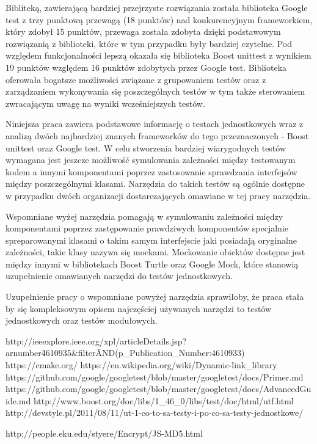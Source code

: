 \documentclass[12pt,a4paper,notitlepage]{report}
\begin{document}
	Bibliteką, zawierającą bardziej przejrzyste rozwiązania została biblioteka Google test z trzy punktową przewagą (18 punktów) nad konkurencyjnym frameworkiem, który zdobył 15 punktów, przewaga została zdobyta dzięki podstawowym rozwiązanią z biblioteki, które w tym przypadku były bardziej czytelne. Pod względem funkcjonalności lepszą okazała się biblioteka Boost unittest z wynikiem 19 punktów względem 16 punktów zdobytych przez Google test. Biblioteka oferowała bogatsze możliwości związane z grupowaniem testów oraz z zarządzaniem wykonywania się poszczególnych testów w tym także sterowaniem zwracającym uwagę na wyniki wcześniejszych testów.

	Niniejsza praca zawiera podstawowe informację o testach jednostkowych wraz z analizą dwóch najbardziej znanych frameworków do tego przeznaczonych - Boost unittest oraz Google test. W celu stworzenia bardziej wiarygodnych testów wymagana jest jeszcze możliwość symulowania zależności między testowanym kodem a innymi komponentami poprzez zastosowanie sprawdzania interfejsów między poszczególnymi klasami. Narzędzia do takich testów są ogólnie dostępne w przypadku dwóch organizacji dostarczających omawiane w tej pracy narzędzia.

	Wspomniane wyżej narzędzia pomagają w symulowaniu zależności między komponentami poprzez zastępowanie prawdziwych komponentów specjalnie spreparowanymi klasami o takim samym interfejscie jaki posiadają oryginalne zależności, takie klasy nazywa się mockami. Mockowanie obiektów dostępne jest między innymi w bibliotekach Boost Turtle oraz Google Mock, które stanowią uzupełnienie omawianych narzędzi do testów jednostkowych.

	Uzupełnienie pracy o wspomniane powyżej narzędzia sprawiłoby, że praca stała by się kompleksowym opisem najczęściej używanych narzędzi to testów jednostkowych oraz testów modułowych.

	\begin{thebibliography}{1}
		 http://ieeexplore.ieee.org/xpl/articleDetails.jsp?arnumber\=4610935\&filter\=AND(p{\_}Publication{\_}Number:4610933)
		 https://cmake.org/
		 https://en.wikipedia.org/wiki/Dynamic-link{\_}library
	  	 https://github.com/google/googletest/blob/master/googletest/docs/Primer.md
	  	 https://github.com/google/googletest/blob/master/googletest/docs/AdvancedGuide.md
	  	 http://www.boost.org/doc/libs/1{\_}46{\_}0/libs/test/doc/html/utf.html
	  	 http://devstyle.pl/2011/08/11/ut-1-co-to-sa-testy-i-po-co-sa-testy-jednostkowe/

	  	 http://people.eku.edu/styere/Encrypt/JS-MD5.html
	 \end{thebibliography}
\end{document}
